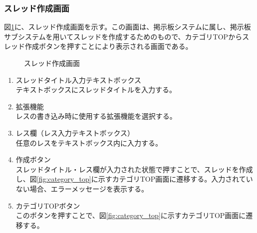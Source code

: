 \documentclass[a4j]{jarticle}
\begin{document}
\subsubsection{スレッド作成画面}
図\ref{fig:make_thread}に、スレッド作成画面を示す。この画面は、掲示板システムに属し、掲示板サブシステムを用いてスレッドを作成するためのもので、カテゴリTOPからスレッド作成ボタンを押すことにより表示される画面である。\\
\begin{figure}[H]
\centering
{}
\caption{スレッド作成画面}
\label{fig:make_thread}
\end{figure}

\begin{enumerate}
  \renewcommand{\labelenumi}{\textcircled{\scriptsize \theenumi}}

\item スレッドタイトル入力テキストボックス\\
テキストボックスにスレッドタイトルを入力する。

\item 拡張機能\\
レスの書き込み時に使用する拡張機能を選択する。

\item レス欄（レス入力テキストボックス）\\
任意のレスをテキストボックス内に入力する。

\item 作成ボタン\\
スレッドタイトル・レス欄が入力された状態で押すことで、スレッドを作成し、図\ref{fig:category_top}に示すカテゴリTOP画面に遷移する。入力されていない場合、エラーメッセージを表示する。

\item カテゴリTOPボタン\\
  このボタンを押すことで、図\ref{fig:category_top}に示すカテゴリTOP画面に遷移する。

\end{enumerate}
\end{document}
